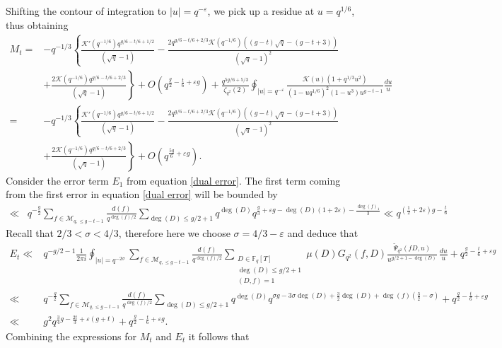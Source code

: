 \documentclass[table]{amsart}
\numberwithin{equation}{section}
\begin{document}
\noindent Shifting the contour of integration to $|u|=q^{-\varepsilon}$, we pick up a residue at $u=q^{1/6}$, thus obtaining
{\small\[
\begin{split}
M_{t}= & -q^{-1/3}\left\{ \frac{\mathcal{K}'(q^{-1/6}) q^{g/6-t/6+1/2}}{(\sqrt{q}-1)}-\frac{2 q^{g/6-t/6+2/3}\mathcal{K}(q^{-1/6})\left((g-t)\sqrt{q}-(g-t+3)\right)}{(\sqrt{q}-1)^2}\right.\\& \left.+\frac{2\mathcal{K}(q^{-1/6})q^{g/6-t/6+2/3}}{(\sqrt{q}-1)}\right\}+O\left(q^{\frac{g}{2}-\frac{t}{6}+\varepsilon g}\right) 
+\frac{q^{5 g / 6+5 / 3}}{\zeta_{q^{2}}(2)} \oint_{|u|=q^{-\varepsilon}} \frac{\mathcal{K}(u)\left(1+q^{1 / 3} u^{2}\right)}{\left(1-u q^{1 / 6}\right)^2\left(1-u^{3}\right) u^{g-t-1}} \frac{d u}{u} \\
= & -q^{-1/3}\left\{ \frac{\mathcal{K}'(q^{-1/6}) q^{g/6-t/6+1/2}}{(\sqrt{q}-1)}-\frac{2 q^{g/6-t/6+2/3}\mathcal{K}(q^{-1/6})\left((g-t)\sqrt{q}-(g-t+3)\right)}{(\sqrt{q}-1)^2}\right.\\
&\left.+\frac{2\mathcal{K}(q^{-1/6})q^{g/6-t/6+2/3}}{(\sqrt{q}-1)}\right\} +O\left(q^{\frac{5 g}{6}+\varepsilon g}\right).
\end{split}
\]}
Consider the error term $E_1$ from equation \eqref{dual error}. The first term coming from the first error in equation \eqref{dual error} will be bounded by
\begin{align*} 
\ll &q^{-\frac{g}{2}}\sum_{f \in \mathcal{M}_{q,\leq g-t-1}}\frac{d(f)}{q^{\deg(f)/2}} \sum_{\deg(D)\leq g/2+1} q^{\deg(D)} q^{\frac{g}{3}+\varepsilon g-\deg(D)(1+2\varepsilon)-\frac{\deg(f)_1}{3}}
\ll q^{\left(\frac{1}{2}+2\varepsilon\right)g -\frac{t}{6}}
\end{align*}
\noindent Recall that $2/3<\sigma<4/3$, therefore here we choose $\sigma=4/3-\varepsilon$ and deduce that
{\small\begin{align*}
E_t \ll &q^{-g/2-1} \frac{1}{2 \pi i} \oint_{|u|=q^{-2\sigma}} \sum_{f \in \mathcal{M}_{q,\leq g-t-1}} \frac{d(f)}{q^{\deg(f)/2}} \sum_{\substack{D \in \mathbb{F}_q[T] \\ \deg(D) \leq g/2+1 \\ (D,f)=1}} \mu(D) G_{q^2}(f,D) \frac{\tilde{\Psi}_{q^2}(fD,u)}{u^{g/2+1-\deg(D)}} \, \frac{du}{u} +q^{\frac{g}{2} - \frac{t}{6} + \varepsilon g}\\
\ll& q^{-\frac{g}{2}}\sum_{f \in \mathcal{M}_{q,\leq g-t-1}}\frac{d(f)}{q^{\deg(f)/2}} \sum_{\deg(D)\leq g/2+1} q^{\deg(D)} q^{\sigma g-3 \sigma \deg(D)+\frac{3}{2}\deg(D)+\deg(f) ( \tfrac{3}{2}-\sigma)}+q^{\frac{g}{2} - \frac{t}{6} + \varepsilon g}\\
\ll& g^2 q^{\frac{3}{4}g -\frac{2t}{3}+\varepsilon (g+t)}+q^{\frac{g}{2} - \frac{t}{6} + \varepsilon g}.
\end{align*}} Combining the expressions for $M_t$ and $E_t$ it follows that
\end{document}

